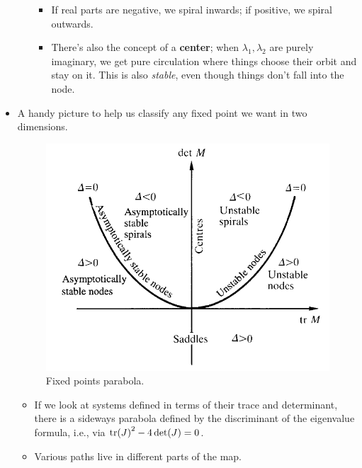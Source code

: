 \documentclass[../notes.tex]{subfiles}
\begin{document}
\begin{itemize}
\begin{enumerate}
        \begin{itemize}
            \item If real parts are negative, we spiral inwards; if positive, we spiral outwards.
            \item There's also the concept of a \textbf{center}; when $\lambda_1,\lambda_2$ are purely imaginary, we get pure circulation where things choose their orbit and stay on it. This is also \emph{stable}, even though things don't fall into the node.
        \end{itemize}
    \end{enumerate}
    \item A handy picture to help us classify any fixed point we want in two dimensions.
    \begin{figure}[h!]
        \centering
        \includegraphics[width=0.4\linewidth]{../ExtFiles/fixedPointParabola.png}
        \caption{Fixed points parabola.}
        \label{fig:fixedPointParabola}
    \end{figure}
    \begin{itemize}
        \item If we look at systems defined in terms of their trace and determinant, there is a sideways parabola defined by the discriminant of the eigenvalue formula, i.e., via $\tr(J)^2-4\det(J)=0$.
        \item Various paths live in different parts of the map.
    \end{itemize}
\end{itemize}
\end{document}
